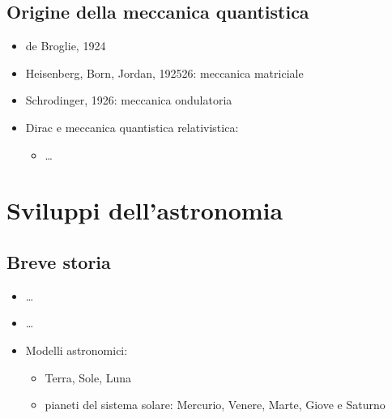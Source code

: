 \documentclass[letterpaper,10pt,italian]{jupyterBook}
\begin{document}
\section{Origine della meccanica quantistica}
\label{\detokenize{ch/modern/quantum:origine-della-meccanica-quantistica}}\begin{itemize}
\item {} 
\sphinxAtStartPar
de Broglie, 1924

\item {} 
\sphinxAtStartPar
Heisenberg, Born, Jordan, 1925\sphinxhyphen{}26: meccanica matriciale

\item {} 
\sphinxAtStartPar
Schrodinger, 1926: meccanica ondulatoria

\item {} 
\sphinxAtStartPar
Dirac e meccanica quantistica relativistica:
\begin{itemize}
\item {} 
\sphinxAtStartPar
…

\end{itemize}

\end{itemize}

\sphinxstepscope


\chapter{Sviluppi dell’astronomia}
\label{\detokenize{ch/modern/astronomy:sviluppi-dell-astronomia}}\label{\detokenize{ch/modern/astronomy:physics-hs-modern-astronomy}}\label{\detokenize{ch/modern/astronomy::doc}}

\section{Breve storia}
\label{\detokenize{ch/modern/astronomy:breve-storia}}
\sphinxAtStartPar
{}
\begin{itemize}
\item {} 
\sphinxAtStartPar
…

\end{itemize}

\sphinxAtStartPar
{}
\begin{itemize}
\item {} 
\sphinxAtStartPar
…

\item {} 
\sphinxAtStartPar
Modelli astronomici:
\begin{itemize}
\item {} 
\sphinxAtStartPar
Terra, Sole, Luna

\item {} 
\sphinxAtStartPar
pianeti del sistema solare: Mercurio, Venere, Marte, Giove e Saturno

\end{itemize}

\end{itemize}
\end{document}
